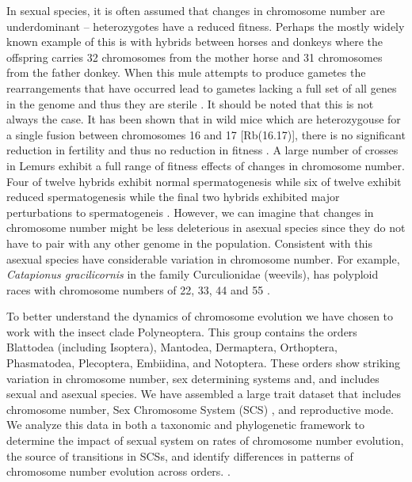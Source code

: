 In sexual species, it is often assumed that changes in chromosome number are underdominant \citep{white1973} -- heterozygotes have a reduced fitness. 
Perhaps the mostly widely known example of this is with hybrids between horses and donkeys where the offspring carries 32 chromosomes from the mother horse and 31 chromosomes from the father donkey. 
When this mule attempts to produce gametes the rearrangements that have occurred lead to gametes lacking a full set of all genes in the genome and thus they are sterile \citep{wodsedalek1916}. 
It should be noted that this is not always the case.
It has been shown that in wild mice which are heterozygouse for a single fusion between chromosomes 16 and 17 [Rb(16.17)], there is no significant reduction in fertility and thus no reduction in fitness \citep{britton1990robertsonian}.
A large number of crosses in Lemurs exhibit a full range of fitness effects of changes in chromosome number.
Four of twelve hybrids exhibit normal spermatogenesis while six of twelve exhibit reduced spermatogenesis while the final two hybrids exhibited major perturbations to spermatogeneis \citep{ratomponirina1988}.   
However, we can imagine that changes in chromosome number might be less deleterious in asexual species since they do not have to pair with any other genome in the population.
Consistent with this asexual species have considerable variation in chromosome number. 
For example, \textit{Catapionus gracilicornis} in the family Curculionidae (weevils), has polyploid races with chromosome numbers of 22, 33, 44 and 55 \citep{lachowska1998}. 

To better understand the dynamics of chromosome evolution we have chosen to work with the insect clade Polyneoptera.
This group contains the orders Blattodea (including Isoptera), Mantodea, Dermaptera, Orthoptera, Phasmatodea, Plecoptera, Embiidina, and Notoptera.
These orders show striking variation in chromosome number, sex determining systems and, and includes sexual and asexual species. 
We have assembled a large trait dataset that includes chromosome number, Sex Chromosome System (SCS) , and reproductive mode.
We analyze this data in both a taxonomic and phylogenetic framework to determine the impact of sexual system on rates of chromosome number evolution, the source of transitions in SCSs, and identify differences in patterns of chromosome number evolution across orders. \nocite{*}.
 
